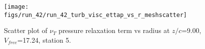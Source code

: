 \begin{figure}[H]
\centering
\texttt{[image: figs/run\_42/run\_42\_turb\_visc\_ettap\_vs\_r\_meshscatter]}
\caption{Scatter plot of $\nu_T$ pressure relaxation term vs radius at $z/c$=9.00, $V_{free}$=17.24, station 5.}
\label{fig:run_42_turb_visc_ettap_vs_r_meshscatter}
\end{figure}



